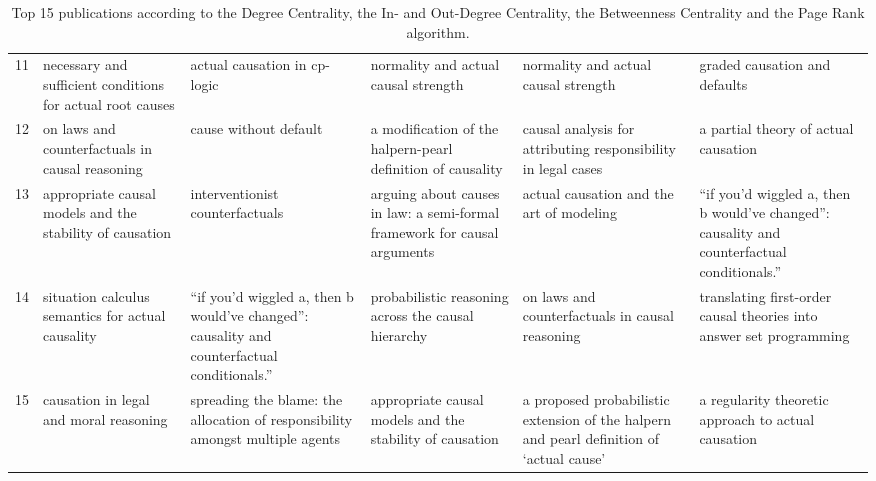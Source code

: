 \documentclass[11pt,a4paper]{book}
\theoremstyle{definition}
\theoremstyle{definition}
\theoremstyle{definition}
\theoremstyle{remark}
\begin{document}
\begin{table}
\begin{tabular}{l p{3.7cm} p{3.7cm}p{3.7cm} p{3.7cm}p{3.7cm} }
11 &         necessary and sufficient conditions for actual root causes &                                                                actual causation in cp-logic &                                       normality and actual causal strength &                                                      normality and actual causal strength &                                                               graded causation and defaults \\
12 &                    on laws and counterfactuals in causal reasoning &                                                                       cause without default &                a modification of the halpern-pearl definition of causality &                             causal analysis for attributing responsibility in legal cases &                                                        a partial theory of actual causation \\
13 &           appropriate causal models and the stability of causation &                                                             interventionist counterfactuals &  arguing about causes in law: a semi-formal framework for causal arguments &                                                  actual causation and the art of modeling &  “if you’d wiggled a, then b would’ve changed”: causality and counterfactual conditionals.” \\
14 &                  situation calculus semantics for actual causality &  “if you’d wiggled a, then b would’ve changed”: causality and counterfactual conditionals.” &                        probabilistic reasoning across the causal hierarchy &                                           on laws and counterfactuals in causal reasoning &                         translating first-order causal theories into answer set programming \\
15 &                             causation in legal and moral reasoning &               spreading the blame: the allocation of responsibility amongst multiple agents &                   appropriate causal models and the stability of causation &  a proposed probabilistic extension of the halpern and pearl definition of ‘actual cause’ &                                         a regularity theoretic approach to actual causation \\
\bottomrule

\end{tabular}
\caption{Top 15 publications according to the Degree Centrality, the In- and Out-Degree Centrality, the Betweenness Centrality and the Page Rank algorithm.}
\label{tab:pub_ranking}
\end{table}
\end{document}
